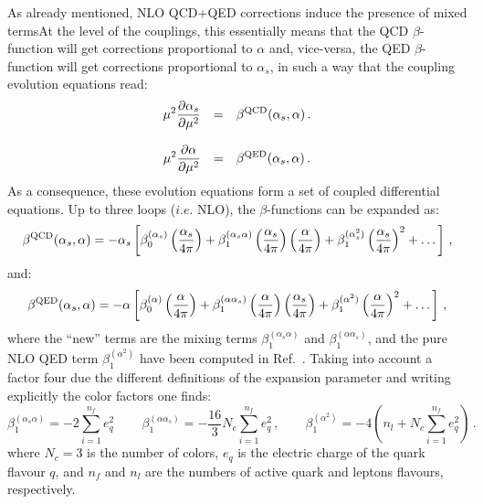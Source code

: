 \begin{widetext}
As already mentioned, NLO QCD+QED corrections induce the presence of
mixed termsAt the level of the couplings, this essentially means that
the QCD $\beta$-function will get corrections proportional to $\alpha$
and, vice-versa, the QED $\beta$-function will get corrections
proportional to $\alpha_s$, in such a way that the coupling evolution
equations read:
\begin{equation}\label{CoupledEq}
\begin{array}{rcl}
\displaystyle \mu^2\frac{\partial \alpha_s}{\partial \mu^2} &=& \displaystyle
                                                \beta^{\rm QCD}(\alpha_s,\alpha)\,.\\
\\
\displaystyle \mu^2\frac{\partial \alpha}{\partial \mu^2} &=& \displaystyle \beta^{\rm QED}(\alpha_s,\alpha)\,.
\end{array}
\end{equation}
As a consequence, these evolution equations form a set of coupled
differential equations. Up to three loops ($i.e.$ NLO), the
$\beta$-functions can be expanded as:
\begin{equation}
\beta^{\rm QCD}(\alpha_s,\alpha) = -\alpha_s\left[\beta_0^{(\alpha_s)}\left(\frac{\alpha_s}{4\pi}\right)+\beta_1^{(\alpha_s\alpha)}\left(\frac{\alpha_s}{4\pi}\right) \left(\frac{\alpha}{4\pi}\right)+\beta_1^{(\alpha_s^2)}\left(\frac{\alpha_s}{4\pi}\right)^2+\dots\right]\,,
\end{equation}
and:
\begin{equation}
\beta^{\rm QED}(\alpha_s,\alpha) = -\alpha\left[\beta_0^{(\alpha)}\left(\frac{\alpha}{4\pi}\right)+\beta_1^{(\alpha\alpha_s)}\left(\frac{\alpha}{4\pi}\right) \left(\frac{\alpha_s}{4\pi}\right)+\beta_1^{(\alpha^2)}\left(\frac{\alpha}{4\pi}\right)^2+\dots\right]\,,
\end{equation}
where the ``new'' terms are the mixing terms
$\beta_1^{(\alpha_s\alpha)}$ and $\beta_1^{(\alpha\alpha_s)}$, and the
pure NLO QED term $\beta_1^{(\alpha^2)}$ have been computed in
Ref.~\cite{Surguladze:1996hx}. Taking into account a factor four due
the different definitions of the expansion parameter and writing
explicitly the color factors one finds:
\begin{equation}\label{eq:NewBetaTerms}
\beta_1^{(\alpha_s\alpha)} = -2\sum_{i=1}^{n_f}
e_q^2\,\qquad\beta_1^{(\alpha\alpha_s)} = -\frac{16}{3}N_c\sum_{i=1}^{n_f} e_q^2\,,\qquad \beta_1^{(\alpha^2)} = -4\left(n_l+N_c\sum_{i=1}^{n_f} e_q^2\right)\,.
\end{equation}
where $N_c=3$ is the number of colors, $e_q$ is the electric charge of
the quark flavour $q$, and $n_f$ and $n_l$ are the numbers of active
quark and leptons flavours, respectively.



\end{widetext}
